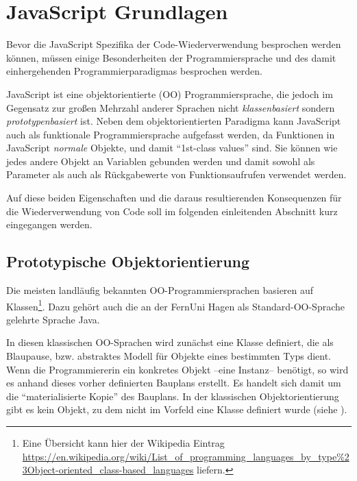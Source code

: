 
\section{JavaScript Grundlagen}

Bevor die JavaScript Spezifika der Code-Wiederverwendung besprochen werden können, müssen einige Besonderheiten der Programmiersprache und des damit einhergehenden Programmierparadigmas besprochen werden.

JavaScript ist eine objektorientierte (OO) Programmiersprache, die jedoch im Gegensatz zur großen Mehrzahl anderer Sprachen nicht \emph{klassenbasiert} sondern \emph{prototypenbasiert} ist. Neben dem objektorientierten Paradigma kann JavaScript auch als funktionale Programmiersprache aufgefasst werden, da Funktionen in JavaScript \emph{normale} Objekte, und damit "`1st-class values"' sind. Sie können wie jedes andere Objekt an Variablen gebunden werden und damit sowohl als Parameter als auch als Rückgabewerte von Funktionsaufrufen verwendet werden. 

Auf diese beiden Eigenschaften und die daraus resultierenden Konsequenzen für die Wiederverwendung von Code soll im folgenden einleitenden Abschnitt kurz eingegangen werden.

\subsection{Prototypische Objektorientierung}

Die meisten landläufig bekannten OO-Programmiersprachen basieren auf Klassen\footnote{Eine Übersicht kann hier der Wikipedia Eintrag \url{https://en.wikipedia.org/wiki/List_of_programming_languages_by_type\%23Object-oriented_class-based_languages} liefern.}. Dazu gehört auch die an der FernUni Hagen als Standard-OO-Sprache gelehrte Sprache Java.


In diesen klassischen OO-Sprachen wird zunächst eine Klasse definiert, die als Blaupause, bzw. abstraktes Modell für Objekte eines bestimmten Typs dient. Wenn die Programmiererin ein konkretes Objekt --eine Instanz-- benötigt, so wird es anhand dieses vorher definierten Bauplans erstellt. Es handelt sich damit um die "`materialisierte Kopie"' des Bauplans. In der klassischen Objektorientierung gibt es kein Objekt, zu dem nicht im Vorfeld eine Klasse definiert wurde (siehe \citep[p. 69]{SimpsonThisobjectprototypes2014}).

